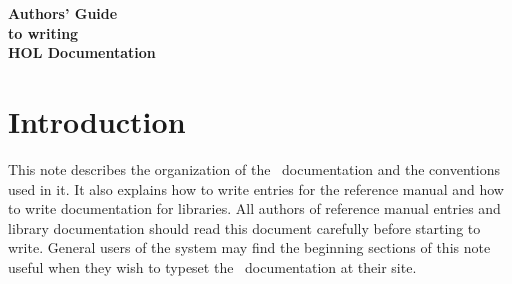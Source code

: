 





\def\id{{$\langle${\it id\/}$\rangle$}}
\def\th{{$\langle${\it th\/}$\rangle$}}
\def\file{{$\langle${\it file}$\rangle$}}
\def\filen#1{{$\langle${\it file} #1$\rangle$}}
\def\doc{{\tt .doc}}
\def\jac{{\tt .jac}}
\def\bnum#1{{\raise0.6pt\hbox{(}#1\raise0.6pt\hbox{)}}}
\def\latex{{\LaTeX}}
\def\sp{\hspace*{3.5mm}}

\def\vsp{{\tt\char`\ }}
\def\bk{{\tt\char`\\ }}
\def\lb{{\tt\char`\{}}
\def\rb{{\tt\char`\}}}
\def\meta#1{\(\langle\){\it #1}\(\rangle\)}



   \setlength{\unitlength}{1mm}           %
   \setlength{\baselineskip}{16pt}        %
   \pagestyle{plain}                      %


\vskip20mm

\begin{center}
\LARGE \bf Authors' Guide\\
to writing\\
HOL Documentation
\end{center}

\vskip20mm

\section*{Introduction}

This note describes the organization of the \HOL\ documentation and the
conventions used in it.  It also explains how to write entries for the
reference manual and how to write documentation for libraries.  All authors of
reference manual entries and library documentation should read this document
carefully before starting to write.  General users of the system may find the
beginning sections of this note useful when they wish to typeset the \HOL\
documentation at their site.

